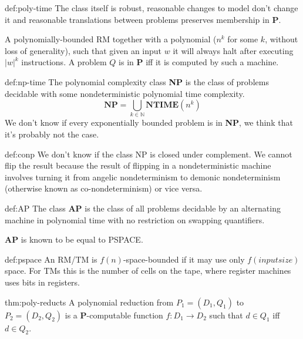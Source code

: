 \documentclass[landscape, 8pt]{extarticle}
\begin{document}
\begin{multicols}{3}
\begin{dfn}{def:poly-time}{}
The class itself is robust, reasonable changes to model don't change it and reasonable translations between problems preserves membership in \textbf{P}.

A polynomially-bounded RM together with a polynomial ($n^k$ for some $k$, without loss of generality), such that given an input $w$ it will always halt after executing $|w|^k$ instructions. A problem $Q$ is in \textbf{P} iff it is computed by such a machine.
\end{dfn}

\begin{dfn}{def:np-time}{}
The polynomial complexity class \textbf{NP} is the class of problems decidable with some nondeterministic polynomial time complexity.
\[\textbf{NP} = \bigcup_{k \in \mathbb{N}} \textbf{NTIME}(n^k)\]
\newline
We don't know if every exponentially bounded problem is in \textbf{NP}, we think that it's probably not the case.

\end{dfn}

\begin{dfn}[CoNP]{def:conp}{}
We don't know if the class NP is closed under complement. We cannot flip the result because the result of flipping in a nondeterministic machine involves turning it from angelic nondeterminism to demonic nondeterminism (otherwise known as co-nondeterminism) or vice versa.
\end{dfn}

\begin{dfn}{def:AP}{}
The class \textbf{AP} is the class of all problems decidable by an alternating machine in polynomial time with no restriction on swapping quantifiers.

\textbf{AP} is known to be equal to PSPACE.
\end{dfn}

\begin{dfn}{def:pspace}{}
An RM/TM is $f(n)$-space-bounded if it may use only $f(inputsize)$ space. For TMs this is the number of cells on the tape, where register machines uses bits in registers.

\end{dfn}

\begin{thm}{thm:poly-reducts}{}
A polynomial reduction from $P_1 = (D_1, Q_1)$ to $P_2 = (D_2, Q_2)$ is a \textbf{P}-computable function $f : D_1 \to D_2$ such that $d \in Q_1$ iff $d \in Q_2$.


\end{thm}
\end{multicols}
\end{document}
